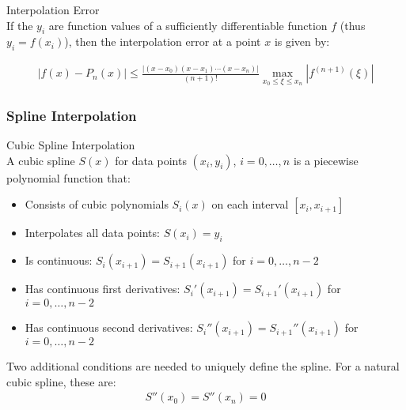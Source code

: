 \begin{theorem}{Interpolation Error}\\
If the $y_i$ are function values of a sufficiently differentiable function $f$ (thus $y_i = f(x_i)$), then the interpolation error at a point $x$ is given by:

\begin{align*}
|f(x) - P_n(x)| \leq \frac{|(x-x_0)(x-x_1)\cdots(x-x_n)|}{(n+1)!} \max_{x_0 \leq \xi \leq x_n} |f^{(n+1)}(\xi)|
\end{align*}
\end{theorem}

\subsubsection{Spline Interpolation}

\begin{definition}{Cubic Spline Interpolation}\\
A cubic spline $S(x)$ for data points $(x_i, y_i)$, $i=0,\ldots,n$ is a piecewise polynomial function that:
\begin{itemize}
    \item Consists of cubic polynomials $S_i(x)$ on each interval $[x_i, x_{i+1}]$
    \item Interpolates all data points: $S(x_i) = y_i$
    \item Is continuous: $S_i(x_{i+1}) = S_{i+1}(x_{i+1})$ for $i=0,\ldots,n-2$
    \item Has continuous first derivatives: $S_i'(x_{i+1}) = S_{i+1}'(x_{i+1})$ for $i=0,\ldots,n-2$
    \item Has continuous second derivatives: $S_i''(x_{i+1}) = S_{i+1}''(x_{i+1})$ for $i=0,\ldots,n-2$
\end{itemize}

Two additional conditions are needed to uniquely define the spline. For a natural cubic spline, these are:
\begin{align*}
S''(x_0) = S''(x_n) = 0
\end{align*}
\end{definition}

